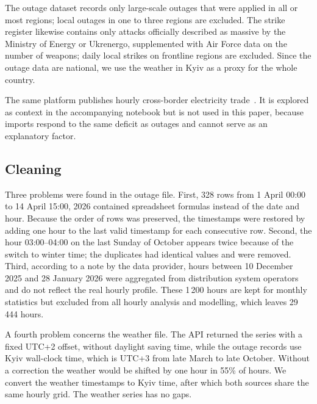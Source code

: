 \documentclass[9pt,twocolumn,letterpaper]{extarticle}
\begin{document}
The outage dataset records only large-scale outages that were applied in all or most regions; local outages in one to three regions are excluded. The strike register likewise contains only attacks officially described as massive by the Ministry of Energy or Ukrenergo, supplemented with Air Force data on the number of weapons; daily local strikes on frontline regions are excluded. Since the outage data are national, we use the weather in Kyiv as a proxy for the whole country.

The same platform publishes hourly cross-border electricity trade~\cite{dixitrade}. It is explored as context in the accompanying notebook but is not used in this paper, because imports respond to the same deficit as outages and cannot serve as an explanatory factor.

\subsection{Cleaning}
Three problems were found in the outage file. First, 328 rows from 1 April 00:00 to 14 April 15:00, 2026 contained spreadsheet formulas instead of the date and hour. Because the order of rows was preserved, the timestamps were restored by adding one hour to the last valid timestamp for each consecutive row. Second, the hour 03:00--04:00 on the last Sunday of October appears twice because of the switch to winter time; the duplicates had identical values and were removed. Third, according to a note by the data provider, hours between 10 December 2025 and 28 January 2026 were aggregated from distribution system operators and do not reflect the real hourly profile. These 1\,200 hours are kept for monthly statistics but excluded from all hourly analysis and modelling, which leaves 29\,444 hours.

A fourth problem concerns the weather file. The API returned the series with a fixed UTC+2 offset, without daylight saving time, while the outage records use Kyiv wall-clock time, which is UTC+3 from late March to late October. Without a correction the weather would be shifted by one hour in 55\% of hours. We convert the weather timestamps to Kyiv time, after which both sources share the same hourly grid. The weather series has no gaps.
\end{document}
